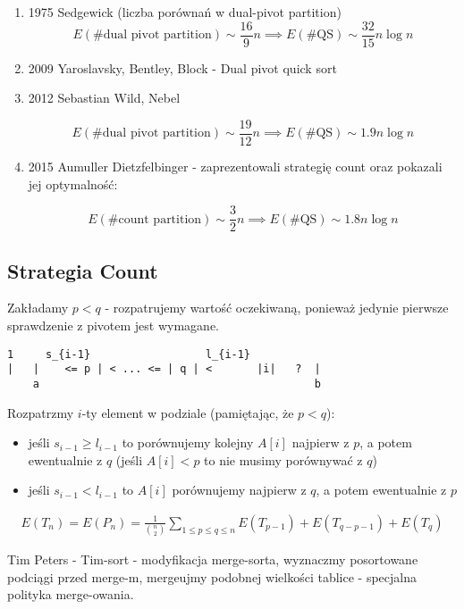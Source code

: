 \documentclass{article}
\begin{document}
\begin{enumerate}

\item 1975 Sedgewick (liczba porównań w dual-pivot partition) 
\[
    E(\text{\# dual pivot partition})\sim \frac{16}{9} n \implies E(\text{\# QS}) \sim \frac{32}{15} n\log n
\]

\item 2009 Yaroslavsky, Bentley, Block - Dual pivot quick sort

\item 2012 Sebastian Wild, Nebel

\[
    E(\text{\# dual pivot partition})\sim \frac{19}{12} n \implies E(\text{\# QS}) \sim 1.9 n\log n
\]

\item 2015 Aumuller Dietzfelbinger - zaprezentowali strategię count oraz pokazali jej optymalność:

\[
    E(\text{\# count partition})\sim \frac{3}{2} n \implies E(\text{\# QS}) \sim 1.8 n\log n
\]
\end{enumerate}

\subsection{Strategia Count}

Zakładamy $p < q$ - rozpatrujemy wartość oczekiwaną, ponieważ jedynie pierwsze sprawdzenie z pivotem jest wymagane.

\begin{verbatim}
1     s_{i-1}                  l_{i-1}
|   |    <= p | < ... <= | q | <       |i|   ?  |
    a                                           b
\end{verbatim}
Rozpatrzmy $i$-ty element w podziale (pamiętając, że $p < q$):
\begin{itemize}
    \item jeśli $s_{i-1} \geq l_{i-1}$ to porównujemy kolejny $A[i]$ najpierw z $p$, a potem ewentualnie z $q$
    (jeśli $A[i] < p$ to nie musimy porównywać z $q$)
    \item jeśli $s_{i-1} < l_{i-1}$ to $A[i]$ porównujemy najpierw z $q$, a potem ewentualnie z $p$
\end{itemize}

\begin{align}
    E(T_n) = E(P_n) = \frac{1}{\binom{n}{2}} \sum_{1\leq p \leq q\leq n} E(T_{p-1}) + E(T_{q-p-1}) + E(T_q)
\end{align}

Tim Peters - Tim-sort - modyfikacja merge-sorta, wyznaczmy posortowane podciągi przed merge-m, mergeujmy podobnej wielkości tablice - specjalna polityka merge-owania.
\end{document}
